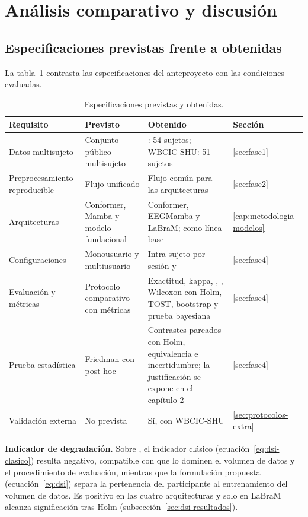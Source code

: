 \section{Análisis comparativo y discusión}

\subsection{Especificaciones previstas frente a obtenidas}

La tabla~\ref{tab:especificaciones} contrasta las especificaciones del anteproyecto con las condiciones evaluadas.
\begin{table}[H]
\centering
\caption{Especificaciones previstas y obtenidas.}
\label{tab:especificaciones}
\small
\begin{tabular}{p{2.8cm}p{3.2cm}p{5.2cm}p{2cm}}
\toprule
\textbf{Requisito} & \textbf{Previsto} & \textbf{Obtenido} & \textbf{Sección} \\
\midrule
Datos multisujeto & Conjunto público multisujeto & \openbmi{}: 54 sujetos; WBCIC-SHU: 51 sujetos & \ref{sec:fase1} \\
Preprocesamiento reproducible & Flujo unificado & Flujo común para las arquitecturas & \ref{sec:fase2} \\
Arquitecturas & Conformer, Mamba y modelo fundacional & Conformer, EEGMamba y LaBraM; \eegnet{} como línea base & \ref{cap:metodologia-modelos} \\
Configuraciones & Monousuario y multiusuario & Intra-sujeto por sesión y \loso{} & \ref{sec:fase4} \\
Evaluación y métricas & Protocolo comparativo con métricas & Exactitud, kappa, \dsi{}, \idp{}, Wilcoxon con Holm, TOST, bootstrap y prueba bayesiana & \ref{sec:fase4} \\
Prueba estadística & Friedman con post-hoc & Contrastes pareados con Holm, equivalencia e incertidumbre; la justificación se expone en el capítulo 2 & \ref{sec:fase4} \\
Validación externa & No prevista & Sí, con WBCIC-SHU & \ref{sec:protocolos-extra} \\
\bottomrule
\end{tabular}
\end{table}

\textbf{Indicador de degradación.} Sobre \openbmi{}, el indicador clásico
(ecuación~\eqref{eq:dsi-clasico}) resulta negativo, compatible con que lo dominen el volumen de datos y el
procedimiento de evaluación, mientras que la formulación propuesta (ecuación~\eqref{eq:dsi}) separa la
pertenencia del participante al entrenamiento del volumen de datos. Es positivo en las cuatro arquitecturas y
solo en LaBraM alcanza significación tras Holm (subsección~\ref{sec:dsi-resultados}).

